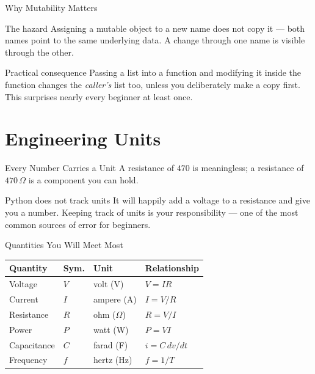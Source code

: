 \documentclass[9pt,aspectratio=169,xcolor=table]{beamer}
\newcommand{\striped}{\rowcolors{1}{white}{stripe}}
\begin{document}
\begin{frame}{Why Mutability Matters}
    \leavevmode
    \begin{alertblock}{The hazard}
        Assigning a mutable object to a new name does \alert{not} copy
        it --- both names point to the same underlying data. A change
        through one name is visible through the other.
    \end{alertblock}

    \vspace{3mm}
    \begin{block}{Practical consequence}
        \small Passing a list into a function and modifying it inside
        the function changes the \emph{caller's} list too, unless you
        deliberately make a copy first. This surprises nearly every
        beginner at least once.
    \end{block}
\end{frame}

\section{Engineering Units}

\begin{frame}{Every Number Carries a Unit}
    \leavevmode
    A resistance of $470$ is meaningless; a resistance of $470\,\Omega$
    is a component you can hold.

    \vspace{3mm}
    \begin{alertblock}{Python does not track units}
        It will happily add a voltage to a resistance and give you a
        number. Keeping track of units is \alert{your} responsibility
        --- one of the most common sources of error for beginners.
    \end{alertblock}
\end{frame}

\begin{frame}{Quantities You Will Meet Most}
    \leavevmode
    \small
    \striped
    \begin{center}
    \begin{tabular}{p{2.6cm}p{1.1cm}p{1.8cm}p{4.0cm}}
        \toprule
        \textbf{Quantity} & \textbf{Sym.} & \textbf{Unit} & \textbf{Relationship} \\
        \midrule
        Voltage      & $V$ & volt (V)    & $V = IR$ \\
        Current      & $I$ & ampere (A)  & $I = V/R$ \\
        Resistance   & $R$ & ohm ($\Omega$) & $R = V/I$ \\
        Power        & $P$ & watt (W)    & $P = VI$ \\
        Capacitance  & $C$ & farad (F)   & $i = C\,dv/dt$ \\
        Frequency    & $f$ & hertz (Hz)  & $f = 1/T$ \\
        \bottomrule
    \end{tabular}
    \end{center}
\end{frame}
\end{document}
